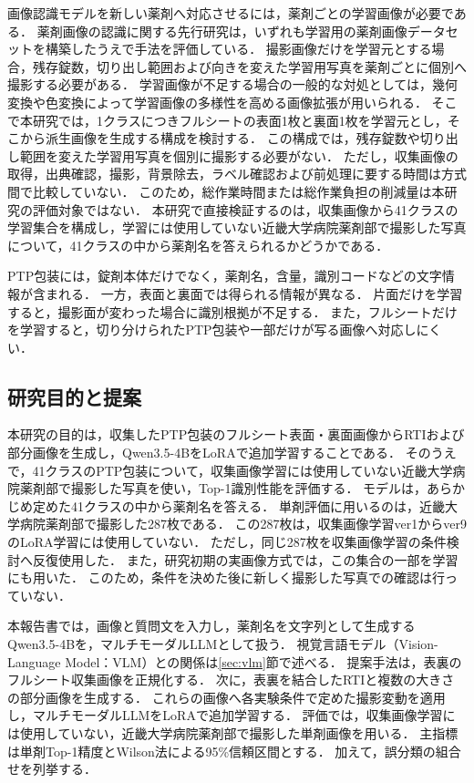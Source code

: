 \documentclass[uplatex,dvipdfmx]{jsarticle}
\begin{document}
画像認識モデルを新しい薬剤へ対応させるには，薬剤ごとの学習画像が必要である．
薬剤画像の認識に関する先行研究は，いずれも学習用の薬剤画像データセットを構築したうえで手法を評価している\cite{heo2023pill,radli2024word,radli2024metric}．
撮影画像だけを学習元とする場合，残存錠数，切り出し範囲および向きを変えた学習用写真を薬剤ごとに個別へ撮影する必要がある．
学習画像が不足する場合の一般的な対処としては，幾何変換や色変換によって学習画像の多様性を高める画像拡張が用いられる\cite{shorten2019augmentation}．
そこで本研究では，1クラスにつきフルシートの表面1枚と裏面1枚を学習元とし，そこから派生画像を生成する構成を検討する．
この構成では，残存錠数や切り出し範囲を変えた学習用写真を個別に撮影する必要がない．
ただし，収集画像の取得，出典確認，撮影，背景除去，ラベル確認および前処理に要する時間は方式間で比較していない．
このため，総作業時間または総作業負担の削減量は本研究の評価対象ではない．
本研究で直接検証するのは，収集画像から41クラスの学習集合を構成し，学習には使用していない近畿大学病院薬剤部で撮影した写真について，41クラスの中から薬剤名を答えられるかどうかである．

PTP包装には，錠剤本体だけでなく，薬剤名，含量，識別コードなどの文字情報が含まれる．
一方，表面と裏面では得られる情報が異なる．
片面だけを学習すると，撮影面が変わった場合に識別根拠が不足する．
また，フルシートだけを学習すると，切り分けられたPTP包装や一部だけが写る画像へ対応しにくい．

\subsection{研究目的と提案}

本研究の目的は，収集したPTP包装のフルシート表面・裏面画像からRTIおよび部分画像を生成し，Qwen3.5-4BをLoRAで追加学習することである．
そのうえで，41クラスのPTP包装について，収集画像学習には使用していない近畿大学病院薬剤部で撮影した写真を使い，Top-1識別性能を評価する．
モデルは，あらかじめ定めた41クラスの中から薬剤名を答える．
単剤評価に用いるのは，近畿大学病院薬剤部で撮影した287枚である．
この287枚は，収集画像学習ver1からver9のLoRA学習には使用していない．
ただし，同じ287枚を収集画像学習の条件検討へ反復使用した．
また，研究初期の実画像方式では，この集合の一部を学習にも用いた．
このため，条件を決めた後に新しく撮影した写真での確認は行っていない．

本報告書では，画像と質問文を入力し，薬剤名を文字列として生成するQwen3.5-4Bを，マルチモーダルLLMとして扱う．
視覚言語モデル（Vision-Language Model：VLM）との関係は\ref{sec:vlm}節で述べる．
提案手法は，表裏のフルシート収集画像を正規化する．
次に，表裏を結合したRTIと複数の大きさの部分画像を生成する．
これらの画像へ各実験条件で定めた撮影変動を適用し，マルチモーダルLLMをLoRAで追加学習する．
評価では，収集画像学習には使用していない，近畿大学病院薬剤部で撮影した単剤画像を用いる．
主指標は単剤Top-1精度とWilson法による95\%信頼区間とする．
加えて，誤分類の組合せを列挙する．
\end{document}
